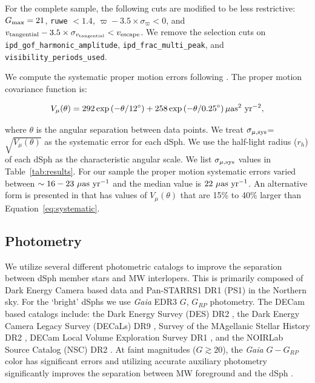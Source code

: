 \documentclass[twocolumn]{aastex63}
\newcommand{\degree}{\ensuremath{{}^{\circ}}\xspace}
\begin{document}
For the complete sample, the following cuts are modified to be less restrictive:  
$G_{\rm max}=21$, \texttt{ruwe} $<1.4$,  $\varpi - 3.5 \times \sigma_\varpi < 0$, and $v_{\rm tangential} - 3.5 \times \sigma_{v_{\rm tangential}} < v_{\rm escape}$.
We remove the selection cuts on \texttt{ipd\_gof\_harmonic\_amplitude},   \texttt{ipd\_frac\_multi\_peak}, and \texttt{visibility\_periods\_used}.

We compute the systematic proper motion errors following \citet{Gaia_Lindegren_2021A&A...649A...2L}.
The proper motion covariance function is:

\begin{equation}
\label{eq:systematic}
    V_{\mu}(\theta) = 292 \exp{\left(-\theta /12\degree \right)}+258 \exp{\left(-\theta /0.25\degree \right)} \, {\rm \mu as^2 ~ yr^{-2}},
\end{equation}

\noindent where $\theta$ is the angular separation between data points. 
We treat $\sigma_{\mu, {\rm sys}}$=$\sqrt{V_{\mu}(\theta)}$ as the systematic error for each dSph. We use the half-light radius ($r_h$) of each dSph as the characteristic angular scale. We list $\sigma_{\mu, {\rm sys}}$ values in Table~\ref{tab:results}.
For our sample the proper motion systematic errors varied between $\sim 16-23~{\rm \mu as ~ yr^{-1}}$ and the median value is $22~{\rm \mu as ~ yr^{-1}}$. 
An alternative form is presented in \citet{Vasiliev2021MNRAS.505.5978V} that has values of $V_{\mu}(\theta)$ that are 15\% to 40\% larger than Equation~\ref{eq:systematic}. 


\subsection{Photometry}


We utilize several different photometric catalogs to improve the separation between dSph member stars and MW interlopers. 
This is primarily composed of Dark Energy Camera \citep[DECam;][]{Flaugher2015AJ....150..150F} based data  and Pan-STARRS1 DR1 (PS1) \citep{Chambers2016arXiv161205560C} in the Northern sky.
For the `bright' dSphs  we  use {\it Gaia} EDR3  $G$, $G_{RP}$  photometry. 
The DECam based catalogs include: the Dark Energy Survey (DES) DR2 \citep{DES2021ApJS..255...20A},  the Dark Energy Camera Legacy Survey (DECaLs) DR9 \citep{Dey2019AJ....157..168D}, Survey of the MAgellanic Stellar History DR2 \citep{Nidever2021AJ....161...74N}, DECam Local Volume Exploration Survey DR1 \citep{DrlicaWagner2021ApJS..256....2D}, and the NOIRLab Source Catalog  (NSC) DR2 \citep{Nidever2021AJ....161..192N}. 
{At faint magnitudes ($G\gtrsim 20$), the {\it Gaia} $G-G_{RP}$ color has significant errors and utilizing accurate auxiliary photometry significantly improves the separation between MW foreground and the dSph \citep[see Figure~1 of][]{Pace2019ApJ...875...77P}.}
\end{document}
